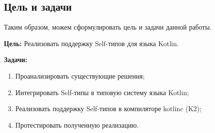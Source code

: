 \subsection{Цель и задачи}

Таким образом, можем сформулировать цель и задачи данной работы.

\textbf{Цель: } Реализовать поддержку Self-типов для языка Kotlin.

\textbf{Задачи:}
\begin{enumerate}
    \item Проанализировать существующие решения;
    \item Интегрировать Self-типы в типовую систему языка Kotlin;
    \item Реализовать поддержку Self-типов в компиляторе kotlinc (K2);
    \item Протестировать полученную реализацию.
\end{enumerate}
